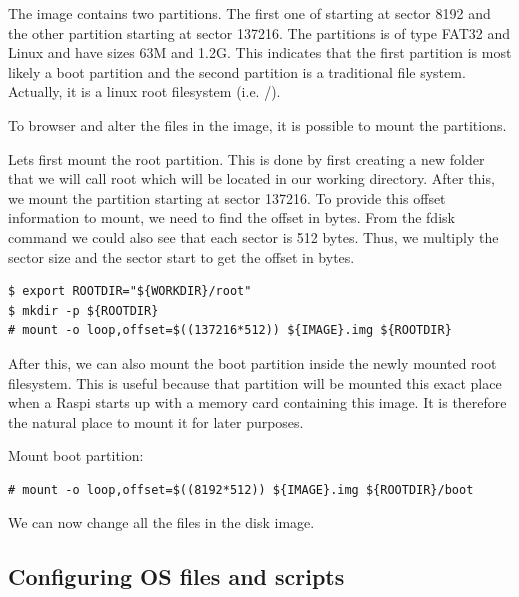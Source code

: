 The image contains two partitions. The first one of starting at sector 8192 and
the other partition starting at sector 137216. The partitions is of type FAT32
and Linux and have sizes 63M and 1.2G. This indicates that the first partition
is most likely a boot partition and the second partition is a traditional file
system. Actually, it is a linux root filesystem (i.e. /).







To browser and alter the files in the image, it is possible to mount the partitions.

Lets first mount the root partition. This is done by first creating a new folder
that we will call root which will be located in our working directory. After this,
we mount the partition starting at sector 137216. To provide this offset information
to mount, we need to find the offset in bytes. From the fdisk command we could also
see that each sector is 512 bytes. Thus, we multiply the sector size and the sector
start to get the offset in bytes.

\begin{lstlisting}[]
$ export ROOTDIR="${WORKDIR}/root"
$ mkdir -p ${ROOTDIR}
# mount -o loop,offset=$((137216*512)) ${IMAGE}.img ${ROOTDIR}
\end{lstlisting}
\FloatBarrier

After this, we can also mount the boot partition inside the newly mounted
root filesystem. This is useful because that partition will be mounted
this exact place when a \ac{Raspi} starts up with a memory card containing
this image. It is therefore the natural place to mount it for later purposes.

Mount boot partition:
\begin{lstlisting}[]
# mount -o loop,offset=$((8192*512)) ${IMAGE}.img ${ROOTDIR}/boot
\end{lstlisting}
\FloatBarrier

We can now change all the files in the disk image.



\subsection{Configuring OS files and scripts}


